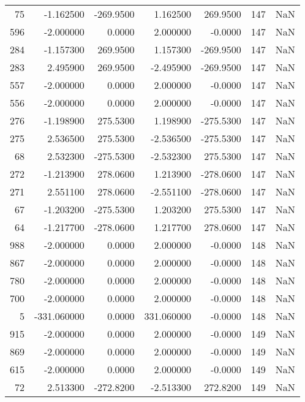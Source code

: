 \begin{tabular}{rrrrrrr}
  75 &   -1.162500 & -269.9500 &    1.162500 &    269.9500 &         147 & NaN \\
 596 &   -2.000000 &    0.0000 &    2.000000 &     -0.0000 &         147 & NaN \\
 284 &   -1.157300 &  269.9500 &    1.157300 &   -269.9500 &         147 & NaN \\
 283 &    2.495900 &  269.9500 &   -2.495900 &   -269.9500 &         147 & NaN \\
 557 &   -2.000000 &    0.0000 &    2.000000 &     -0.0000 &         147 & NaN \\
 556 &   -2.000000 &    0.0000 &    2.000000 &     -0.0000 &         147 & NaN \\
 276 &   -1.198900 &  275.5300 &    1.198900 &   -275.5300 &         147 & NaN \\
 275 &    2.536500 &  275.5300 &   -2.536500 &   -275.5300 &         147 & NaN \\
  68 &    2.532300 & -275.5300 &   -2.532300 &    275.5300 &         147 & NaN \\
 272 &   -1.213900 &  278.0600 &    1.213900 &   -278.0600 &         147 & NaN \\
 271 &    2.551100 &  278.0600 &   -2.551100 &   -278.0600 &         147 & NaN \\
  67 &   -1.203200 & -275.5300 &    1.203200 &    275.5300 &         147 & NaN \\
  64 &   -1.217700 & -278.0600 &    1.217700 &    278.0600 &         147 & NaN \\
 988 &   -2.000000 &    0.0000 &    2.000000 &     -0.0000 &         148 & NaN \\
 867 &   -2.000000 &    0.0000 &    2.000000 &     -0.0000 &         148 & NaN \\
 780 &   -2.000000 &    0.0000 &    2.000000 &     -0.0000 &         148 & NaN \\
 700 &   -2.000000 &    0.0000 &    2.000000 &     -0.0000 &         148 & NaN \\
   5 & -331.060000 &    0.0000 &  331.060000 &     -0.0000 &         148 & NaN \\
 915 &   -2.000000 &    0.0000 &    2.000000 &     -0.0000 &         149 & NaN \\
 869 &   -2.000000 &    0.0000 &    2.000000 &     -0.0000 &         149 & NaN \\
 615 &   -2.000000 &    0.0000 &    2.000000 &     -0.0000 &         149 & NaN \\
  72 &    2.513300 & -272.8200 &   -2.513300 &    272.8200 &         149 & NaN \\

\end{tabular}

